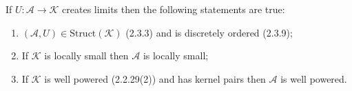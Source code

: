 If $U: \mathcal{A} \longrightarrow \mathcal{K}$ creates limits then the following statements are true:

\begin{enumerate}
\item $(\mathcal{A}, U) \in \text{Struct}(\mathcal{K})$ (2.3.3) and is discretely ordered (2.3.9);
\item If $\mathcal{K}$ is locally small then $\mathcal{A}$ is locally small;
\item If $\mathcal{K}$ is well powered (2.2.29(2)) and has kernel pairs then $\mathcal{A}$ is well powered.
\end{enumerate}

